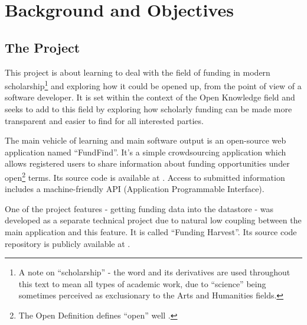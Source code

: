 \chapter{Background and Objectives}



\section{The Project}
\label{intro-project}
This project is about learning to deal with the field of funding in modern scholarship\footnote{A note on ``scholarship'' - the word and its derivatives are used throughout this text to mean all types of academic work, due to ``science'' being sometimes perceived as exclusionary to the Arts and Humanities fields.} and exploring how it could be opened up, from the point of view of a software developer. It is set within the context of the Open Knowledge field and seeks to add to this field by exploring how scholarly funding can be made more transparent and easier to find for all interested parties.

The main vehicle of learning and main software output is an open-source web application named ``FundFind''. It's a simple crowdsourcing application which allows registered users to share information about funding opportunities under open\footnote{The Open Definition defines ``open'' well \cite{od}.} terms. Its source code is available at \cite{fundfind-src}. Access to submitted information includes a machine-friendly API (Application Programmable Interface).

One of the project features - getting funding data into the datastore - was developed as a separate technical project due to natural low coupling between the main application and this feature. It is called ``Funding Harvest''. Its source code repository is publicly available at \cite{fundingharvest-src}.

